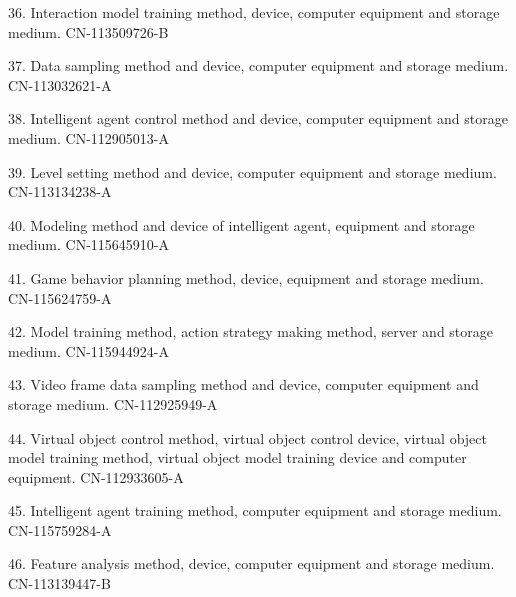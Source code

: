 \documentclass[10pt]{article}
\makeatletter
\newlength{\bibhang}
\newlength{\bibsep}
 {\@listi \global\bibsep\itemsep \global\advance\bibsep by\parsep}
\newenvironment{bibsection}%
        {\vspace{\itemsep}\begin{list}{}{%
       \setlength{\leftmargin}{\bibhang}%
       \setlength{\itemsep}{\bibsep}%
       \setlength{\parsep}{\z@}%
        \setlength{\partopsep}{0pt}%
        \setlength{\topsep}{0pt}}}
        {\end{list}\vspace{\itemsep}}
\makeatother
\begin{document}
\begin{bibsection}
  \item[36.] Interaction model training method, device, computer equipment and storage medium. CN-113509726-B
  \item[37.] Data sampling method and device, computer equipment and storage medium. CN-113032621-A
  \item[38.] Intelligent agent control method and device, computer equipment and storage medium. CN-112905013-A
  \item[39.] Level setting method and device, computer equipment and storage medium. CN-113134238-A
  \item[40.] Modeling method and device of intelligent agent, equipment and storage medium. CN-115645910-A
  \item[41.] Game behavior planning method, device, equipment and storage medium. CN-115624759-A
  \item[42.] Model training method, action strategy making method, server and storage medium. CN-115944924-A
  \item[43.] Video frame data sampling method and device, computer equipment and storage medium. CN-112925949-A
  \item[44.] Virtual object control method, virtual object control device, virtual object model training method, virtual object model training device and computer equipment. CN-112933605-A
  \item[45.] Intelligent agent training method, computer equipment and storage medium. CN-115759284-A
  \item[46.] Feature analysis method, device, computer equipment and storage medium. CN-113139447-B
\end{bibsection}
\end{document}
